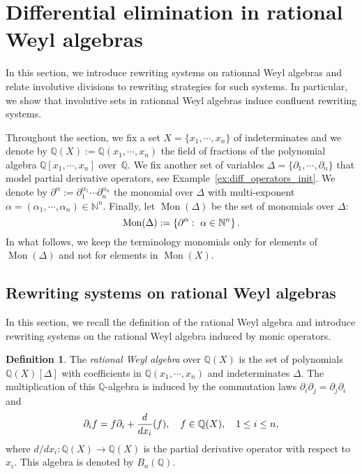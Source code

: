 \documentclass[10pt]{easychair}
\theoremstyle{definition}
\newtheorem{definition}[theorem]{Definition}
\newcommand\diff[1]{\partial_{#1}}
\newcommand\Q{\mathbb{Q}}
\newcommand\N{\mathbb{N}}
\newcommand\QX{\mathbb{Q}[x_1,\cdots,x_n]}
\newcommand\QXX{\mathbb{Q}(x_1,\cdots,x_n)}
\newcommand\Weyl[1]{B_{#1}(\Q)}
\newcommand\monBasis{\Mon(\Delta)}
\DeclareMathOperator{\Mon}{Mon}
\begin{document}
\section{Differential elimination in rational Weyl algebras}
\label{sec:differential_elimination_in_rational_Weyl_algebras}

In this section, we introduce rewriting systems on rationnal Weyl
algebras and relate involutive divisions to rewriting strategies for such
systems. In particular, we show that involutive sets in rationnal Weyl
algebras induce confluent rewriting systems.
\medskip

Throughout the section, we fix a set $X=\{x_1,\cdots,x_n\}$ of
indeterminates and we denote by $\Q(X):=\QXX$ the field of fractions of
the polynomial algebra $\QX$ over~$\Q$. We fix another set of variables
$\Delta=\{\diff{1},\cdots,\diff{n}\}$ that model partial derivative
operators, see Example~\ref{ex:diff_operators_init}. We denote by
$\partial^{\alpha}:=\diff{1}^{\alpha_1}\cdots\diff{n}^{\alpha_n}$ the
monomial over $\Delta$ with multi-exponent
$\alpha=(\alpha_1,\cdots,\alpha_n)\in\N^n$. Finally, let $\monBasis$ be
the set of monomials over $\Delta$:
\[\monBasis:=\left\{\partial^\alpha:\ \alpha\in\N^n\right\}.
\smallskip\]
In what follows, we keep the terminology monomials only for elements of
$\Mon(\Delta)$ and not for elements in $\Mon(X)$.

\subsection{Rewriting systems on rational Weyl algebras}
\label{sec:rewriting_systems_on_Weyl_algebras}

In this section, we recall the definition of the rational Weyl algebra
and introduce rewriting systems on the rational Weyl algebra induced by
monic operators.
\medskip

\begin{definition}
  The {\it rational Weyl algebra} over $\Q(X)$ is the set of polynomials
  $\Q(X)[\Delta]$ with coefficients in $\QXX$ and indeterminates
  $\Delta$. The multiplication of this $\mathbb Q$-algebra is induced by the
  commutation laws $\partial_i\partial_j=\partial_j\partial_i$ and
  \[\diff{i}f=f\diff{i}+\frac{d}{dx_i}(f),\quad f\in\Q(X),\quad
  1\leq i\leq n,
  \smallskip\]
  where $d/dx_i:\Q(X)\to\Q(X)$ is the partial derivative operator with
  respect to~$x_i$. This algebra is denoted by $\Weyl{n}$.
\end{definition}
\smallskip
\end{document}
